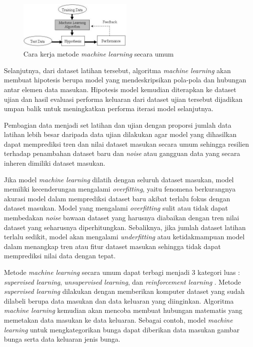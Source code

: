 \begin{figure}[H]
\setlength{}
\begin{center}
\includegraphics[width=0.5\textwidth]{fig/mldiagram.jpg}
	\caption[Cara kerja metode \textit{machine learning} secara umum]{Cara kerja metode \textit{machine learning} secara umum~\cite{2012}}
\label{fig:mldiagram}
\end{center}
\end{figure}

Selanjutnya, dari dataset latihan tersebut, algoritma \textit{machine learning}
akan membuat hipotesis berupa model yang mendeskripsikan pola-pola dan hubungan
antar elemen data masukan. Hipotesis model kemudian diterapkan ke dataset ujian
dan hasil evaluasi performa keluaran dari dataset ujian tersebut dijadikan
umpan balik untuk meningkatkan performa iterasi model selanjutnya.

Pembagian data menjadi set latihan dan ujian dengan proporsi jumlah data
latihan lebih besar daripada data ujian dilakukan agar model yang dihasilkan
dapat memprediksi tren dan nilai dataset masukan secara umum sehingga resilien
terhadap penambahan dataset baru dan \textit{noise} atau gangguan data yang
secara inheren dimiliki dataset masukan.

Jika model \textit{machine learning} dilatih dengan seluruh dataset masukan, model
memiliki kecenderungan mengalami \textit{overfitting}, yaitu fenomena
berkurangnya akurasi model dalam memprediksi dataset baru akibat terlalu
fokus dengan dataset masukan. Model yang mengalami \textit{overfitting} sulit
atau tidak dapat membedakan \textit{noise} bawaan dataset yang harusnya
diabaikan dengan tren nilai dataset yang seharusnya diperhitungkan. Sebaliknya,
jika jumlah dataset latihan terlalu sedikit, model akan mengalami
\textit{underfitting} atau ketidakmampuan model dalam menangkap tren atau fitur
dataset masukan sehingga tidak dapat memprediksi nilai data dengan tepat.

Metode \textit{machine learning} secara umum dapat terbagi menjadi 3 kategori
luas : \textit{supervised learning}, \textit{unsupervised learning}, dan
\textit{reinforcement learning} \cite{russell1995}. Metode \textit{supervised learning} dilakukan
dengan memberikan komputer dataset yang sudah dilabeli berupa data masukan dan
data keluaran yang diinginkan. Algoritma \textit{machine learning} kemudian
akan mencoba membuat hubungan matematis yang memetakan data masukan ke data
keluaran. Sebagai contoh, model \textit{machine learning} untuk mengkategorikan
bunga dapat diberikan data masukan gambar bunga serta data keluaran jenis bunga.

